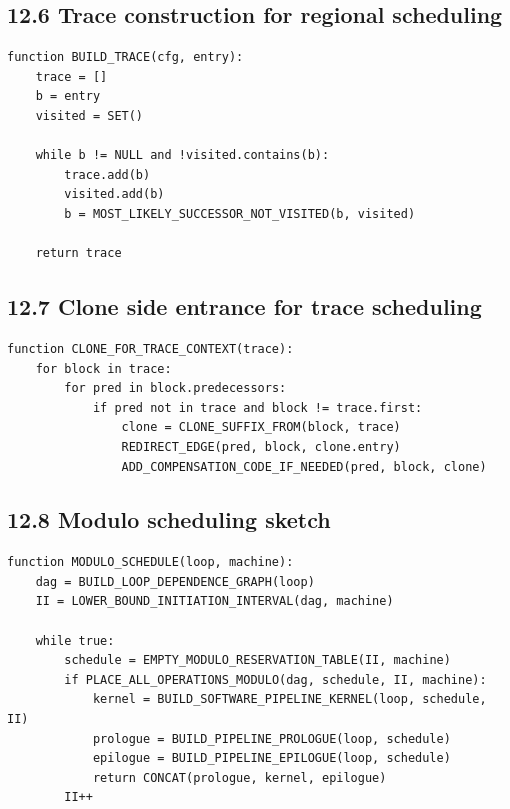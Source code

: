 \documentclass[10pt,letterpaper]{article}
\begin{document}
\subsection*{12.6 Trace construction for regional scheduling}
{}

\begin{verbatim}
function BUILD_TRACE(cfg, entry):
    trace = []
    b = entry
    visited = SET()

    while b != NULL and !visited.contains(b):
        trace.add(b)
        visited.add(b)
        b = MOST_LIKELY_SUCCESSOR_NOT_VISITED(b, visited)

    return trace
\end{verbatim}

\subsection*{12.7 Clone side entrance for trace scheduling}
{}

\begin{verbatim}
function CLONE_FOR_TRACE_CONTEXT(trace):
    for block in trace:
        for pred in block.predecessors:
            if pred not in trace and block != trace.first:
                clone = CLONE_SUFFIX_FROM(block, trace)
                REDIRECT_EDGE(pred, block, clone.entry)
                ADD_COMPENSATION_CODE_IF_NEEDED(pred, block, clone)
\end{verbatim}

\subsection*{12.8 Modulo scheduling sketch}
{}

\begin{verbatim}
function MODULO_SCHEDULE(loop, machine):
    dag = BUILD_LOOP_DEPENDENCE_GRAPH(loop)
    II = LOWER_BOUND_INITIATION_INTERVAL(dag, machine)

    while true:
        schedule = EMPTY_MODULO_RESERVATION_TABLE(II, machine)
        if PLACE_ALL_OPERATIONS_MODULO(dag, schedule, II, machine):
            kernel = BUILD_SOFTWARE_PIPELINE_KERNEL(loop, schedule, II)
            prologue = BUILD_PIPELINE_PROLOGUE(loop, schedule)
            epilogue = BUILD_PIPELINE_EPILOGUE(loop, schedule)
            return CONCAT(prologue, kernel, epilogue)
        II++
\end{verbatim}
\end{document}
